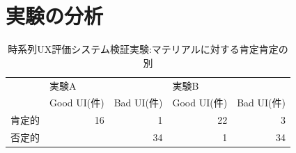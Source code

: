 \section{実験の分析}

\begin{table}[htbp]
\centering
\begin{tabular}{llrlr}
\hline
    & \multicolumn{2}{l}{実験A}                             & \multicolumn{2}{l}{実験B}                             \\ \cline{2-5} 
    & Good UI(件)                & \multicolumn{1}{l}{Bad UI(件)} & Good UI(件)                & \multicolumn{1}{l}{Bad UI(件)} \\ \hline
肯定的 & \multicolumn{1}{r}{16} & 1                          & \multicolumn{1}{r}{22} & 3                          \\
否定的 & \multicolumn{1}{r}{}   & 34                         & \multicolumn{1}{r}{1}  & 34                         \\ \hline
\end{tabular}
\caption{時系列UX評価システム検証実験:マテリアルに対する肯定肯定の別}
\label{table:negaposi}
\end{table}

